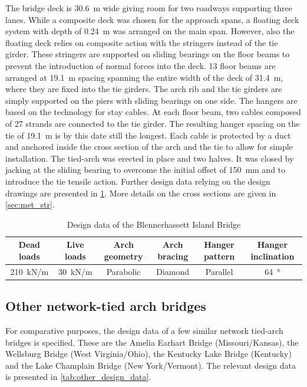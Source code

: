 The bridge deck is \SI{30.6}{m} wide giving room for two roadways supporting three lanes.
While a composite deck was chosen for the approach spans, a floating deck system with depth of \SI{0.24}{m} was arranged on the main span. However, also the floating deck relies on composite action with the stringers instead of the tie girder. These stringers are supported on sliding bearings on the floor beams to prevent the introduction of normal forces into the deck. 13 floor beams are arranged at \SI{19.1}{m} spacing spanning the entire width of the deck of \SI{31.4}{m}, where they are fixed into the tie girders. The arch rib and the tie girders are simply supported on the piers with sliding bearings on one side. The hangers are based on the technology for stay cables. At each floor beam, two cables composed of 27 strands are connected to the tie girder. %
The resulting hanger spacing on the tie of \SI{19.1}{m} is by this date still the longest. Each cable is protected by a duct and anchored inside the cross section of the arch and the tie to allow for simple installation. The tied-arch was erected in place and two halves. It was closed by jacking at the sliding bearing to overcome the initial offset of \SI{150}{mm} and to introduce the tie tensile action. Further design data relying on the design drawings are presented in \cref{tab:Blennerhassett_design_data}. More details on the cross sections are given in \cref{sec:met_str}.
\begin{table}[H]
    \caption{Design data of the Blennerhassett Island Bridge}
    \label{tab:Blennerhassett_design_data}
    \centering
    \begin{tabular}{cccccc}
    \toprule
    Dead loads & Live loads & Arch geometry & Arch bracing & Hanger pattern & Hanger inclination \\ \midrule
    \SI{210}{kN/m} & \SI{30}{kN/m} & Parabolic & Diamond & Parallel & \SI{64}{\degree}  \\ \bottomrule
    \end{tabular}
\end{table}

\subsection{Other network-tied arch bridges}\label{sec:other_bridges}
For comparative purposes, the design data of a few similar network tied-arch bridges is specified. These are the Amelia Earhart Bridge (Missouri/Kansas), the Wellsburg Bridge (West Virginia/Ohio), the Kentucky Lake Bridge (Kentucky) and the Lake Champlain Bridge (New York/Vermont). The relevant design data is presented in \cref{tab:other_design_data}.

